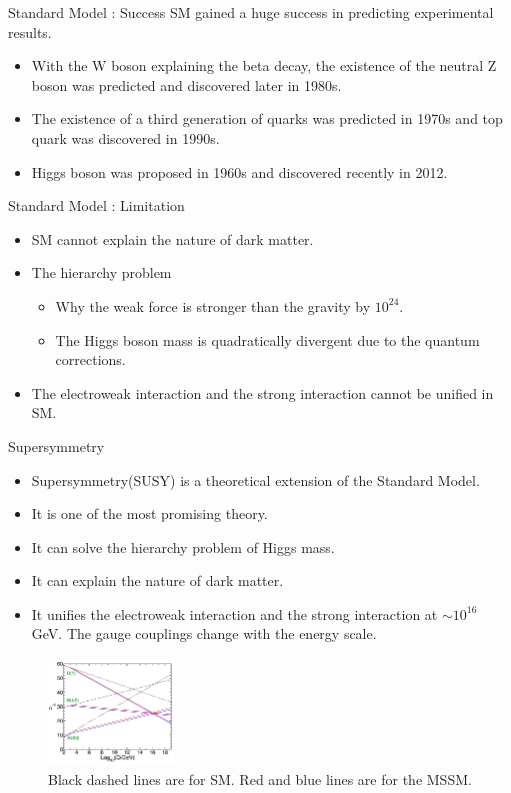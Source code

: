 \documentclass[mathserif,serif]{beamer}
\begin{document}
\begin{frame}{Standard Model : Success}
SM gained a huge success in predicting experimental results.
\begin{itemize}
\item With the W boson explaining the beta decay, the existence of the neutral Z boson was predicted and discovered later in 1980s.
\item The existence of a third generation of quarks was predicted in 1970s and top quark was discovered in 1990s.
\item Higgs boson was proposed in 1960s and discovered recently in 2012.
\end{itemize}
\end{frame}

\begin{frame}{Standard Model : Limitation}
\begin{itemize}
\item SM cannot explain the nature of dark matter.
\item The hierarchy problem
\begin{itemize}
\item Why the weak force is stronger than the gravity by $10^{24}$.
\item The Higgs boson mass is quadratically divergent due to the quantum corrections.
\end{itemize}
\item The electroweak interaction and the strong interaction cannot be unified in SM.
\end{itemize}
\end{frame}

\begin{frame}{Supersymmetry}
\begin{itemize}
\item Supersymmetry(SUSY) is a theoretical extension of the Standard Model.
\item It is one of the most promising theory.
\item It can solve the hierarchy problem of Higgs mass.
\item It can explain the nature of dark matter.
\item It unifies the electroweak interaction and the strong interaction at $\sim 10^{16}$ GeV. The gauge couplings change with the energy scale.
\end{itemize}
\begin{figure}
\centering
\includegraphics[width=0.3\textwidth]{data/photo/theory/unification.png}
\caption{Black dashed lines are for SM. Red and blue lines are for the MSSM.}
\end{figure}
\end{frame}
\end{document}
